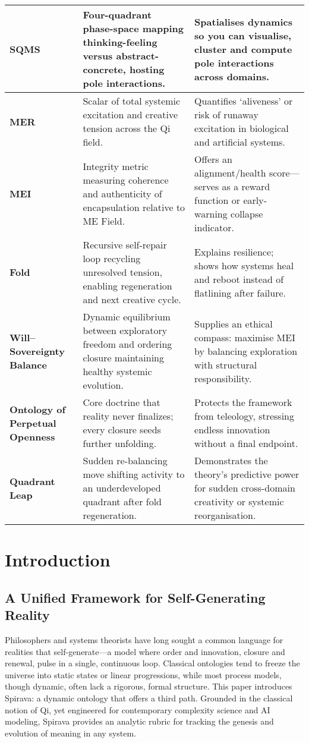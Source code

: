\documentclass[11pt, a4paper]{article}
\begin{document}
\begin{tabularx}{\textwidth}{|l|X|X|}
\textbf{SQMS} & Four-quadrant phase-space mapping thinking-feeling versus abstract-concrete, hosting pole interactions. & Spatialises dynamics so you can visualise, cluster and compute pole interactions across domains. \\
\hline
\textbf{MER} & Scalar of total systemic excitation and creative tension across the Qi field. & Quantifies ‘aliveness’ or risk of runaway excitation in biological and artificial systems. \\
\hline
\textbf{MEI} & Integrity metric measuring coherence and authenticity of encapsulation relative to ME Field. & Offers an alignment/health score—serves as a reward function or early-warning collapse indicator. \\
\hline
\textbf{Fold} & Recursive self-repair loop recycling unresolved tension, enabling regeneration and next creative cycle. & Explains resilience; shows how systems heal and reboot instead of flatlining after failure. \\
\hline
\textbf{Will–Sovereignty Balance} & Dynamic equilibrium between exploratory freedom and ordering closure maintaining healthy systemic evolution. & Supplies an ethical compass: maximise MEI by balancing exploration with structural responsibility. \\
\hline
\textbf{Ontology of Perpetual Openness} & Core doctrine that reality never finalizes; every closure seeds further unfolding. & Protects the framework from teleology, stressing endless innovation without a final endpoint. \\
\hline
\textbf{Quadrant Leap} & Sudden re-balancing move shifting activity to an underdeveloped quadrant after fold regeneration. & Demonstrates the theory’s predictive power for sudden cross-domain creativity or systemic reorganisation. \\
\hline
\end{tabularx}
\newpage


\section{Introduction}

\subsection{A Unified Framework for Self-Generating Reality}
Philosophers and systems theorists have long sought a common language for realities that self-generate—a model where order and innovation, closure and renewal, pulse in a single, continuous loop. Classical ontologies tend to freeze the universe into static states or linear progressions, while most process models, though dynamic, often lack a rigorous, formal structure. This paper introduces Spirava: a dynamic ontology that offers a third path. Grounded in the classical notion of Qi, yet engineered for contemporary complexity science and AI modeling, Spirava provides an analytic rubric for tracking the genesis and evolution of meaning in any system.
\end{document}
